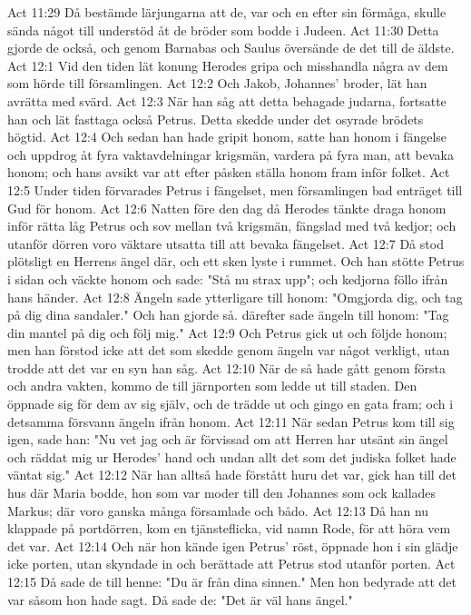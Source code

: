 Act 11:29  Då bestämde lärjungarna att de, var och en efter sin förmåga, skulle sända något till understöd åt de bröder som bodde i Judeen.
Act 11:30  Detta gjorde de också, och genom Barnabas och Saulus översände de det till de äldste.
Act 12:1  Vid den tiden lät konung Herodes gripa och misshandla några av dem som hörde till församlingen.
Act 12:2  Och Jakob, Johannes' broder, lät han avrätta med svärd.
Act 12:3  När han såg att detta behagade judarna, fortsatte han och lät fasttaga också Petrus. Detta skedde under det osyrade brödets högtid.
Act 12:4  Och sedan han hade gripit honom, satte han honom i fängelse och uppdrog åt fyra vaktavdelningar krigsmän, vardera på fyra man, att bevaka honom; och hans avsikt var att efter påsken ställa honom fram inför folket.
Act 12:5  Under tiden förvarades Petrus i fängelset, men församlingen bad enträget till Gud för honom.
Act 12:6  Natten före den dag då Herodes tänkte draga honom inför rätta låg Petrus och sov mellan två krigsmän, fängslad med två kedjor; och utanför dörren voro väktare utsatta till att bevaka fängelset.
Act 12:7  Då stod plötsligt en Herrens ängel där, och ett sken lyste i rummet. Och han stötte Petrus i sidan och väckte honom och sade: "Stå nu strax upp"; och kedjorna föllo ifrån hans händer.
Act 12:8  Ängeln sade ytterligare till honom: "Omgjorda dig, och tag på dig dina sandaler." Och han gjorde så. därefter sade ängeln till honom: "Tag din mantel på dig och följ mig."
Act 12:9  Och Petrus gick ut och följde honom; men han förstod icke att det som skedde genom ängeln var något verkligt, utan trodde att det var en syn han såg.
Act 12:10  När de så hade gått genom första och andra vakten, kommo de till järnporten som ledde ut till staden. Den öppnade sig för dem av sig själv, och de trädde ut och gingo en gata fram; och i detsamma försvann ängeln ifrån honom.
Act 12:11  När sedan Petrus kom till sig igen, sade han: "Nu vet jag och är förvissad om att Herren har utsänt sin ängel och räddat mig ur Herodes' hand och undan allt det som det judiska folket hade väntat sig."
Act 12:12  När han alltså hade förstått huru det var, gick han till det hus där Maria bodde, hon som var moder till den Johannes som ock kallades Markus; där voro ganska många församlade och bådo.
Act 12:13  Då han nu klappade på portdörren, kom en tjänsteflicka, vid namn Rode, för att höra vem det var.
Act 12:14  Och när hon kände igen Petrus' röst, öppnade hon i sin glädje icke porten, utan skyndade in och berättade att Petrus stod utanför porten.
Act 12:15  Då sade de till henne: "Du är från dina sinnen." Men hon bedyrade att det var såsom hon hade sagt. Då sade de: "Det är väl hans ängel."
